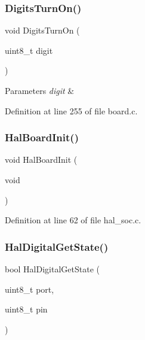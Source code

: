 \mbox{\label{group__hal_gab32fd447ccc48c0f3b71bcf5f7700d25}} 
\subsubsection{\texorpdfstring{Digits\+Turn\+On()}{DigitsTurnOn()}}
{\footnotesize\ttfamily void Digits\+Turn\+On (\begin{DoxyParamCaption}\item[{uint8\+\_\+t}]{digit }\end{DoxyParamCaption})}


\begin{DoxyParams}{Parameters}
{\em digit} & \\
\hline
\end{DoxyParams}


Definition at line 255 of file board.\+c.

\mbox{\label{group__hal_ga37ebfca95548aba0848e1a21c050f11a}} 
\subsubsection{\texorpdfstring{Hal\+Board\+Init()}{HalBoardInit()}}
{\footnotesize\ttfamily void Hal\+Board\+Init (\begin{DoxyParamCaption}\item[{void}]{ }\end{DoxyParamCaption})}



Definition at line 62 of file hal\+\_\+soc.\+c.

\mbox{\label{group__hal_gabb9c91076227523e285aa398a7156598}} 
\subsubsection{\texorpdfstring{Hal\+Digital\+Get\+State()}{HalDigitalGetState()}}
{\footnotesize\ttfamily bool Hal\+Digital\+Get\+State (\begin{DoxyParamCaption}\item[{uint8\+\_\+t}]{port,  }\item[{uint8\+\_\+t}]{pin }\end{DoxyParamCaption})}



